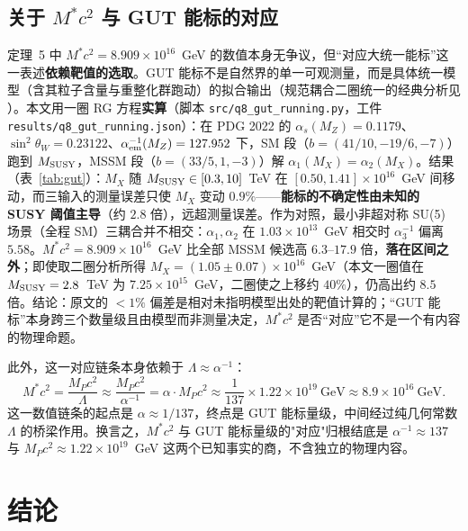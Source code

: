 \documentclass[12pt,a4paper]{article}
\begin{document}
\subsection{关于 $M^*c^2$ 与 GUT 能标的对应}

定理~5 中 $M^*c^2 = 8.909\times10^{16}$~GeV 的数值本身无争议，但“对应大统一能标”这一表述\textbf{依赖靶值的选取}。GUT 能标不是自然界的单一可观测量，而是具体统一模型（含其粒子含量与重整化群跑动）的拟合输出（规范耦合二圈统一的经典分析见 \cite{amaldi1991}）。本文用一圈 RG 方程\textbf{实算}（脚本 \texttt{src/q8\_\allowbreak{}gut\_\allowbreak{}running.py}，工件 \texttt{results/q8\_\allowbreak{}gut\_\allowbreak{}running.json}）：在 PDG 2022 的 $\alpha_s(M_Z)=0.1179$、$\sin^2\theta_W=0.23122$、$\alpha_{\rm em}^{-1}(M_Z)=127.952$ 下，SM 段（$b=(41/10,-19/6,-7)$）跑到 $M_{\rm SUSY}$，MSSM 段（$b=(33/5,1,-3)$）解 $\alpha_1(M_X)=\alpha_2(M_X)$。结果（表~\ref{tab:gut}）：$M_X$ 随 $M_{\rm SUSY}\in[0.3,10]$~TeV 在 $[0.50,1.41]\times10^{16}$~GeV 间移动，而三输入的测量误差只使 $M_X$ 变动 $0.9\%$——\textbf{能标的不确定性由未知的 SUSY 阈值主导}（约 $2.8$ 倍），远超测量误差。作为对照，最小非超对称 SU(5) 场景（全程 SM）三耦合并不相交：$\alpha_1,\alpha_2$ 在 $1.03\times10^{13}$~GeV 相交时 $\alpha_3^{-1}$ 偏离 $5.58$。$M^*c^2 = 8.909\times10^{16}$~GeV 比全部 MSSM 候选高 $6.3$--$17.9$ 倍，\textbf{落在区间之外}；即使取二圈分析所得 $M_X = (1.05\pm0.07)\times10^{16}$~GeV\cite{bourilkov2015}（本文一圈值在$M_{\rm SUSY}=2.8$~TeV 为 $7.25\times10^{15}$~GeV，二圈使之上移约 $40\%$），仍高出约 $8.5$ 倍。结论：原文的 $<1\%$ 偏差是相对未指明模型出处的靶值计算的；“GUT 能标”本身跨三个数量级且由模型而非测量决定，$M^*c^2$ 是否“对应”它不是一个有内容的物理命题。

此外，这一对应链条本身依赖于 $\Lambda \approx \alpha^{-1}$：
\[
  M^*c^2 = \frac{M_P c^2}{\Lambda} \approx \frac{M_P c^2}{\alpha^{-1}} = \alpha \cdot M_P c^2 \approx \frac{1}{137} \times 1.22\times10^{19}~\text{GeV} \approx 8.9\times10^{16}~\text{GeV}.
\]
这一数值链条的起点是 $\alpha \approx 1/137$，终点是 GUT 能标量级，中间经过纯几何常数 $\Lambda$ 的桥梁作用。换言之，$M^*c^2$ 与 GUT 能标量级的"对应"归根结底是 $\alpha^{-1} \approx 137$ 与 $M_P c^2 \approx 1.22\times10^{19}$~GeV 这两个已知事实的商，不含独立的物理内容。

\section{结论}
\end{document}
